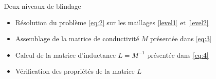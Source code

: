 \begin{frame}{Deux niveaux de blindage}
  \begin{figure}[h!tbp]
    \centering
     \hspace{0.5cm}
    \label{fig:basis:functions}
  \end{figure}
\end{frame}


\begin{itemize}
\item Résolution du problème \ref{eq:2} sur les maillages \ref{level1} et \ref{level2}
\item Assemblage de la matrice de conductivité $M$ présentée dans \ref{eq:3}
\item Calcul de la matrice d'inductance $L=M^{-1}$ présentée dans \ref{eq:4}
\item Vérification des propriétés de la matrice $L$
\end{itemize}

